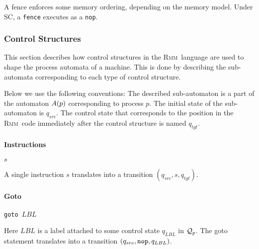 \documentclass[a4paper]{article}
\newcommand{\rmm}{\textsc{Rmm}}
\begin{document}
A fence enforces some memory ordering, depending on the memory
model. Under SC, a {\tt fence} executes as a {\tt nop}.

\subsubsection{Control Structures}

\newcommand{\tikzq}[3]{\node (#1) at (#2) [circle,draw=black,inner sep=0pt,minimum size=25pt] {$#3$}}

This section describes how control structures in the \rmm\ language are
used to shape the process automata of a machine. This is done by
describing the sub-automata corresponding to each type of control
structure.

Below we use the following conventions: The described sub-automaton is
a part of the automaton $A(p)$ corresponding to process
$p$. The initial state of the sub-automaton is $q_{src}$. The control
state that corresponds to the position in the \rmm\ code immediately
after the control structure is named $q_{tgt}$.

\paragraph{Instructions} $s$

A single instruction $s$ translates into a transition
$(q_{src},s,q_{tgt})$.

\begin{center}
\small{
}
\end{center}

\paragraph{Goto} \verb+goto +$LBL$

Here $LBL$ is a label attached to some control state $q_{LBL}$ in
$\mathcal{Q}_{p}$. The goto statement translates into a transition
$(q_{src},\verb+nop+,q_{LBL})$.

\begin{center}
\small{
}
\end{center}
\end{document}
